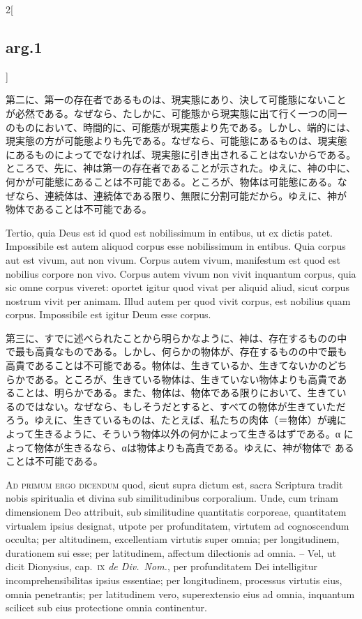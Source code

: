 \documentclass[paper=a4paper,fontsize=10pt,jafontsize=9pt,titlepage]{jlreq}
\begin{document}
\begin{paracol}{2}[\subsection{arg.1}]
\switchcolumn

第二に、第一の存在者であるものは、現実態にあり、決して可能態にないこと
が必然である。なぜなら、たしかに、可能態から現実態に出て行く一つの同一
のものにおいて、時間的に、可能態が現実態より先である。しかし、端的には、
現実態の方が可能態よりも先である。なぜなら、可能態にあるものは、現実態
にあるものによってでなければ、現実態に引き出されることはないからである。
ところで、先に、神は第一の存在者であることが示された。ゆえに、神の中に、
何かが可能態にあることは不可能である。ところが、物体は可能態にある。な
ぜなら、連続体は、連続体である限り、無限に分割可能だから。ゆえに、神が
物体であることは不可能である。

\switchcolumn*

Tertio, quia Deus est id quod est nobilissimum in entibus, ut ex
dictis patet.  Impossibile est autem aliquod corpus esse nobilissimum
in entibus.  Quia corpus aut est vivum, aut non vivum.  Corpus autem
vivum, manifestum est quod est nobilius corpore non vivo.  Corpus
autem vivum non vivit inquantum corpus, quia sic omne corpus viveret:
oportet igitur quod vivat per aliquid aliud, sicut corpus nostrum
vivit per animam.  Illud autem per quod vivit corpus, est nobilius
quam corpus.  Impossibile est igitur Deum esse corpus.

\switchcolumn

第三に、すでに述べられたことから明らかなように、神は、存在するものの中
で最も高貴なものである。しかし、何らかの物体が、存在するものの中で最も
高貴であることは不可能である。物体は、生きているか、生きてないかのどち
らかである。ところが、生きている物体は、生きていない物体よりも高貴であ
ることは、明らかである。また、物体は、物体である限りにおいて、生きてい
るのではない。なぜなら、もしそうだとすると、すべての物体が生きていただ
ろう。ゆえに、生きているものは、たとえば、私たちの肉体（＝物体）が魂に
よって生きるように、そういう物体以外の何かによって生きるはずである。α
によって物体が生きるなら、αは物体よりも高貴である。ゆえに、神が物体で
あることは不可能である。

\switchcolumn*[\subsection{ad.1}]

{\scshape Ad primum ergo dicendum} quod, sicut supra dictum est, sacra
Scriptura tradit nobis spiritualia et divina sub similitudinibus
corporalium. Unde, cum trinam dimensionem Deo attribuit, sub
similitudine quantitatis corporeae, quantitatem virtualem ipsius
designat, utpote per profunditatem, virtutem ad cognoscendum occulta;
per altitudinem, excellentiam virtutis super omnia; per longitudinem,
durationem sui esse; per latitudinem, affectum dilectionis ad
omnia. -- Vel, ut dicit Dionysius, cap.~{\scshape ix} {\itshape de Div.~Nom.},
per profunditatem Dei intelligitur incomprehensibilitas ipsius
essentiae; per longitudinem, processus virtutis eius, omnia
penetrantis; per latitudinem vero, superextensio eius ad omnia,
inquantum scilicet sub eius protectione omnia continentur.


\end{paracol}
\end{document}
